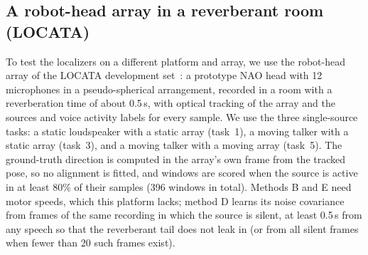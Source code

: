 \subsection{A robot-head  array in a reverberant room (LOCATA)}
\label{sec:case-locata}

To test the localizers on a different platform and array, we use the robot-head array of the LOCATA development set~\cite{lollmann2018locata,evers2020locata}: a prototype NAO head with 12 microphones in a pseudo-spherical arrangement, recorded in a room with a reverberation time of about 0.5\,s, with optical tracking of the array and the sources and voice activity labels for every sample.
We use the three single-source tasks: a static loudspeaker with a static array (task~1), a moving talker with a static array (task~3), and a moving talker with a moving array (task~5).
The ground-truth direction is computed in the array's own frame from the tracked pose, so no alignment is fitted, and windows are scored when the source is active in at least 80\% of their samples (396 windows in total).
Methods B and E need motor speeds, which this platform lacks; method D learns its noise covariance from frames of the same recording in which the source is silent, at least 0.5\,s from any speech so that the reverberant tail does not leak in (or from all silent frames when fewer than 20 such frames exist).

